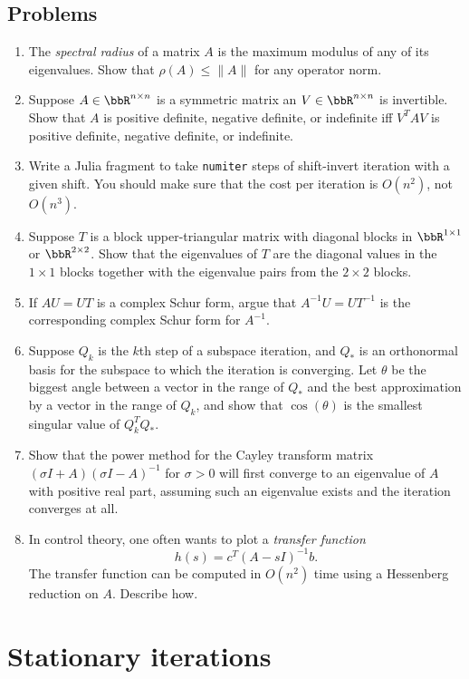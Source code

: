 \documentclass[12pt, leqno]{article}
\begin{document}
\subsection{Problems}

\begin{enumerate}
\item
  The {\em spectral radius} of a matrix $A$ is the maximum modulus
  of any of its eigenvalues.  Show that $\rho(A) \leq \|A\|$ for
  any operator norm.
\item
  Suppose $A \in \bbR^{n \times n}$ is a symmetric matrix an
  $V \in \bbR^{n \times n}$ is invertible.  Show that $A$ is positive
  definite, negative definite, or indefinite iff $V^T A V$ is positive
  definite, negative definite, or indefinite.
\item
  Write a Julia fragment to take {\tt numiter} steps of shift-invert iteration
  with a given shift.  You should make sure that the cost per
  iteration is $O(n^2)$, not $O(n^3)$.
\item
  Suppose $T$ is a block upper-triangular matrix with diagonal blocks
  in $\bbR^{1 \times 1}$ or $\bbR^{2 \times 2}$.  Show that the
  eigenvalues of $T$ are the diagonal values in the $1 \times 1$
  blocks together with the eigenvalue pairs from the $2 \times 2$
  blocks.
\item
  If $A U = U T$ is a complex Schur form, argue that
  $A^{-1} U = U T^{-1}$ is the corresponding complex Schur form for $A^{-1}$.
\item
  Suppose $Q_k$ is the $k$th step of a subspace iteration, and $Q_*$
  is an orthonormal basis for the subspace to which the iteration is
  converging.  Let $\theta$ be the biggest angle between a vector in
  the range of $Q_*$ and the best approximation by a vector in the
  range of $Q_k$, and show that $\cos(\theta)$ is the smallest singular
  value of $Q_k^T Q_*$.
\item
  Show that the power method for the Cayley transform matrix $(\sigma
  I + A) (\sigma I - A)^{-1}$ for $\sigma > 0$ will first converge to
  an eigenvalue of $A$ with positive real part, assuming such an
  eigenvalue exists and the iteration converges at all.
\item
  In control theory, one often wants to plot a {\em transfer function}
  \[
    h(s) = c^T (A-sI)^{-1} b.
  \]
  The transfer function can be computed in $O(n^2)$ time using a
  Hessenberg reduction on $A$.  Describe how.
\end{enumerate}

\newpage
\section{Stationary iterations}
\end{document}
